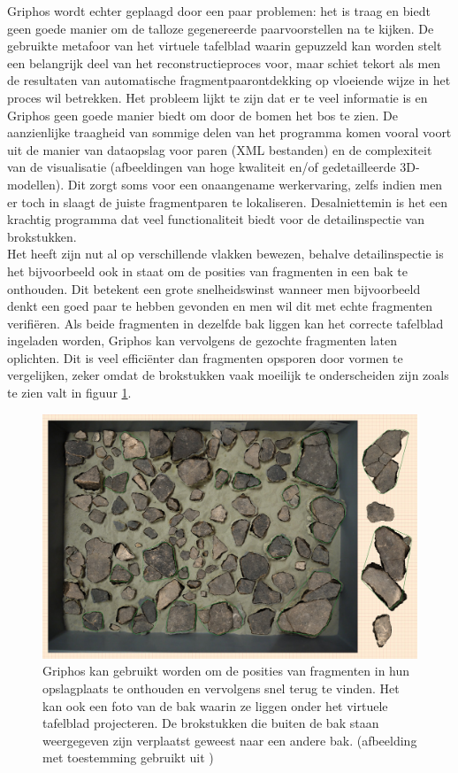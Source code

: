 Griphos wordt echter geplaagd door een paar problemen: het is traag en biedt geen goede manier om de talloze gegenereerde paarvoorstellen na te kijken. De gebruikte metafoor van het virtuele tafelblad waarin gepuzzeld kan worden stelt een belangrijk deel van het reconstructieproces voor, maar schiet tekort als men de resultaten van automatische fragmentpaarontdekking op vloeiende wijze in het proces wil betrekken. Het probleem lijkt te zijn dat er te veel informatie is en Griphos geen goede manier biedt om door de bomen het bos te zien. De aanzienlijke traagheid van sommige delen van het programma komen vooral voort uit de manier van dataopslag voor paren (XML bestanden) en de complexiteit van de visualisatie (afbeeldingen van hoge kwaliteit en/of gedetailleerde 3D-modellen). Dit zorgt soms voor een onaangename werkervaring, zelfs indien men er toch in slaagt de juiste fragmentparen te lokaliseren. Desalniettemin is het een krachtig programma dat veel functionaliteit biedt voor de detailinspectie van brokstukken.\\

Het heeft zijn nut al op verschillende vlakken bewezen, behalve detailinspectie is het bijvoorbeeld ook in staat om de posities van fragmenten in een bak te onthouden. Dit betekent een grote snelheidswinst wanneer men bijvoorbeeld denkt een goed paar te hebben gevonden en men wil dit met echte fragmenten verifi\"eren. Als beide fragmenten in dezelfde bak liggen kan het correcte tafelblad ingeladen worden, Griphos kan vervolgens de gezochte fragmenten laten oplichten. Dit is veel effici\"enter dan fragmenten opsporen door vormen te vergelijken, zeker omdat de brokstukken vaak moeilijk te onderscheiden zijn zoals te zien valt in figuur \ref{fig:griphosbak}. 

\begin{figure}[ht]
	\begin{center}
		\includegraphics[width=.8\columnwidth]{images/griphos-bak-01.png}
		\caption{Griphos kan gebruikt worden om de posities van fragmenten in hun opslagplaats te onthouden en vervolgens snel terug te vinden. Het kan ook een foto van de bak waarin ze liggen onder het virtuele tafelblad projecteren. De brokstukken die buiten de bak staan weergegeven zijn verplaatst geweest naar een andere bak. (afbeelding met toestemming gebruikt uit \cite{Brown2011})}
		\label{fig:griphosbak}
	\end{center}
\end{figure}

